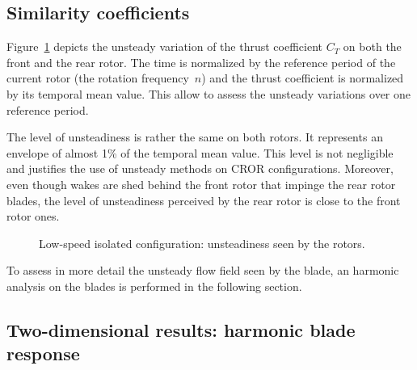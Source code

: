 
\subsection{Similarity coefficients}
\label{sub:dream_ls_hb_sim_coeff}

Figure~\ref{fig:dream_ls_hb_unst_coeff} depicts the
unsteady variation of the thrust coefficient $C_T$ on 
both the front and the rear rotor.
The time is 
normalized by the reference period of the current rotor 
(the rotation frequency~$n$) and the thrust coefficient is normalized
by its temporal mean value. This allow to assess the unsteady variations
over one reference period. 


The level of unsteadiness is rather
the same on both rotors. It represents an envelope of almost
1\% of the temporal mean value. This level is not negligible and
justifies the use of unsteady methods on CROR configurations. 
Moreover, even though wakes are shed behind the front rotor
that impinge the rear rotor blades, the level of unsteadiness
perceived by the rear rotor is close to the front rotor ones.
\begin{figure}[htp]
  \centering
  \caption{Low-speed isolated configuration: unsteadiness seen by the rotors.}
  \label{fig:dream_ls_hb_unst_coeff}
\end{figure}

To assess in more detail the unsteady flow
field seen by the blade, an harmonic analysis on the
blades is performed in the following section.

\subsection{Two-dimensional results: harmonic blade response}
\label{sub:dream_ls_hb_blade_response}

